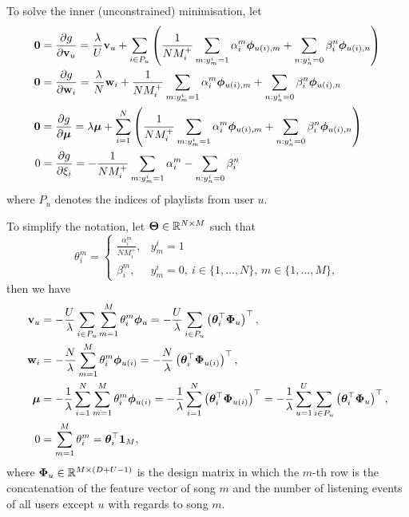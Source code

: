 To solve the inner (unconstrained) minimisation, let
\begin{equation*}
\begin{aligned}
\zero 
&= \frac{\partial g}{\partial \bv_u} 
 = \frac{\lambda}{U} \bv_u 
   + \sum_{i \in P_u} \left( \frac{1}{N M_i^+} \sum_{m: y_m^i = 1} \alpha_i^m \phibm_{u(i),m} + \sum_{n: y_n^i = 0} \beta_i^n \phibm_{u(i),n} \right) \\
%
\zero 
&= \frac{\partial g}{\partial \w_i}
 = \frac{\lambda}{N} \w_i + \frac{1}{N M_i^+} \sum_{m: y_m^i = 1} \alpha_i^m \phibm_{u(i),m} + \sum_{n: y_n^i = 0} \beta_i^n \phibm_{u(i),n} \\
%
\zero 
&= \frac{\partial g}{\partial \mubm} 
 = \lambda \mubm 
   + \sum_{i=1}^N \left( \frac{1}{N M_i^+} \sum_{m: y_m^i = 1} \alpha_i^m \phibm_{u(i),m} + \sum_{n: y_n^i = 0} \beta_i^n \phibm_{u(i),n} \right) \\
%
0
&= \frac{\partial g}{\partial \xi_i}
 = - \frac{1}{N M_i^+} \sum_{m: y_m^i = 1} \alpha_i^m - \sum_{n: y_n^i = 0} \beta_i^n
\end{aligned}
\end{equation*}
where $P_u$ denotes the indices of playlists from user $u$.

To simplify the notation, let $\mathbf{\Theta} \in \mathbb{R}^{N \times M}$ such that
\begin{equation*}
\theta_i^m = 
\begin{cases}
    \frac{\alpha_i^m}{N M_i^+}, & y_m^i = 1 \\
    \beta_i^m, & y_m^i = 0, \ i \in \{1,\dots,N\}, \, m \in \{1,\dots,M\},
\end{cases}
\end{equation*}
then we have
\begin{equation}
\label{eq:dual2primal}
\begin{aligned}
\bv_u
&= -\frac{U}{\lambda} \sum_{i \in P_u} \sum_{m=1}^M \theta_i^m \phibm_u
 = -\frac{U}{\lambda} \sum_{i \in P_u} \left( \thetabm_i^\top \Phibm_u \right)^\top, \\
%
\w_i  
&= -\frac{N}{\lambda} \sum_{m=1}^M \theta_i^m \phibm_{u(i)}
 = -\frac{N}{\lambda} \left( \thetabm_i^\top \Phibm_{u(i)} \right)^\top, \\
%
\mubm
&= -\frac{1}{\lambda} \sum_{i=1}^N \sum_{m=1}^M \theta_i^m \phibm_{u(i)}
 = -\frac{1}{\lambda} \sum_{i=1}^N \left( \thetabm_i^\top \Phibm_{u(i)} \right)^\top
 = -\frac{1}{\lambda} \sum_{u=1}^U \sum_{i \in P_u} \left( \thetabm_i^\top \Phibm_u \right)^\top, \\
%
0
&= \sum_{m=1}^M \theta_i^m
 = \thetabm_i^\top \one_M,
\end{aligned}
\end{equation}
where $\mathbf{\Phi}_u \in \mathbb{R}^{M \times (D + U - 1)}$ is the design matrix in which 
the $m$-th row is the concatenation of the feature vector of song $m$ 
and the number of listening events of all users except $u$ with regards to song $m$.


